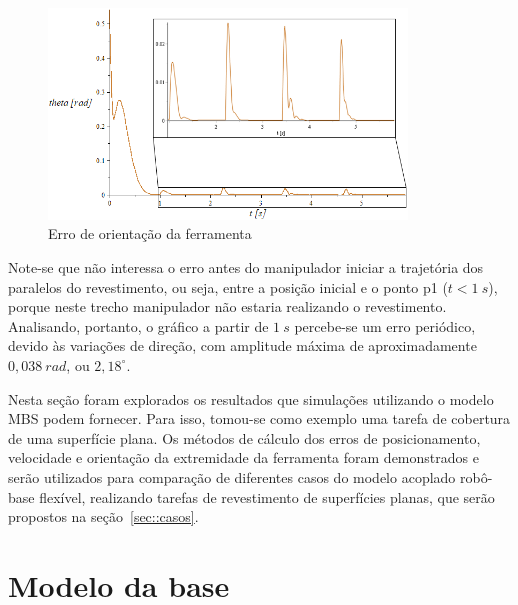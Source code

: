 \begin{figure}[h]
	\centering 
 	\includegraphics[width=0.85\textwidth]{figs/orierro_exemplo_z}
 	\caption{Erro de orientação da ferramenta}
 	\label{fig::orierro_exemplo_z}
\end{figure}

Note-se que não interessa o erro antes do manipulador iniciar a trajetória dos
paralelos do revestimento, ou seja, entre a posição inicial e o ponto p1
($t<1~s$), porque neste trecho manipulador não estaria realizando o
revestimento.
Analisando, portanto, o gráfico a partir de $1~s$ percebe-se um erro periódico,
devido às variações de direção, com amplitude máxima de aproximadamente
$0,038~rad$, ou $2,18^{\circ}$. 

Nesta seção foram explorados os resultados que simulações utilizando o modelo
MBS podem fornecer. Para isso, tomou-se como exemplo uma tarefa de cobertura de
uma superfície plana. Os métodos de cálculo dos erros de posicionamento,
velocidade e orientação da extremidade da ferramenta foram demonstrados e serão
utilizados para comparação de diferentes casos do modelo acoplado robô-base
flexível, realizando tarefas de revestimento de superfícies planas, que serão
propostos na seção~\ref{sec::casos}.



\section{Modelo da base} \label{sec::base}

